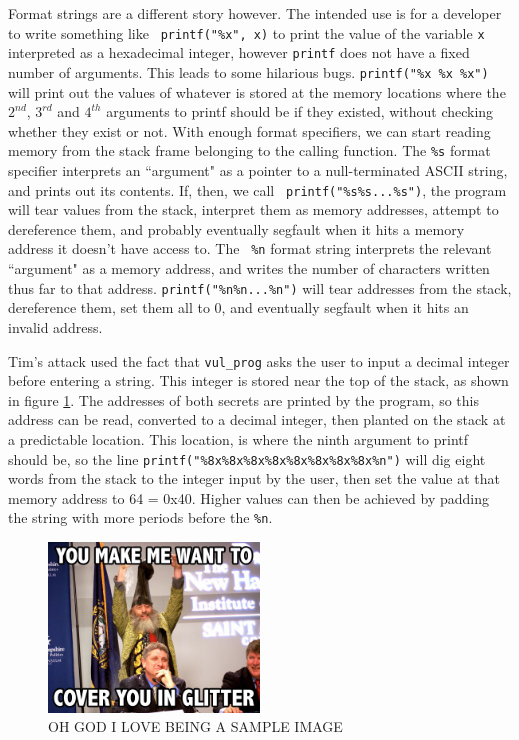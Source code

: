 Format strings are a different story however. The intended use is for a developer to write something like {\tt
printf("\%x", x)} to print the value of the variable {\tt x} interpreted as a hexadecimal integer, however {\tt printf}
does not have a fixed number of arguments. This leads to some hilarious bugs. {\tt printf("\%x \%x \%x")} will print out
the values of whatever is stored at the memory locations where the $2^{nd}$, $3^{rd}$ and $4^{th}$ arguments to printf
should be if they existed, without checking whether they exist or not. With enough format specifiers, we can start
reading memory from the stack frame belonging to the calling function. The {\tt \%s} format specifier interprets an
``argument" as a pointer to a null-terminated ASCII string, and prints out its contents. If, then, we call {\tt
printf("\%s\%s...\%s")}, the program will tear values from the stack, interpret them as memory addresses, attempt to
dereference them, and probably eventually segfault when it hits a memory address it doesn't have access to. The {\tt
\%n} format string interprets the relevant ``argument" as a memory address, and writes the number of characters written
thus far to that address. {\tt printf("\%n\%n...\%n")} will tear addresses from the stack, dereference them, set them
all to 0, and eventually segfault when it hits an invalid address.

Tim's attack used the fact that {\tt vul\_prog} asks the user to input a decimal integer before entering a string. This integer is stored near the top of the stack, as shown in figure \ref{fig_vul_prog_stack}. The addresses of both secrets are printed by the program, so this address can be read, converted to a decimal integer, then planted on the stack at a predictable location. This location, is where the ninth argument to printf should be, so the line {\tt printf("\%8x\%8x\%8x\%8x\%8x\%8x\%8x\%8x\%n")} will dig eight words from the stack to the integer input by the user, then set the value at that memory address to 64 = 0x40. Higher values can then be achieved by padding the string with more periods before the {\tt \%n}.


\begin{figure}[ht]
    \centering
    \includegraphics[width = 0.5\textwidth]{./images/placeholder.jpg}
    \caption{OH GOD I LOVE BEING A SAMPLE IMAGE}
    \label{fig_vul_prog_stack}
\end{figure}


